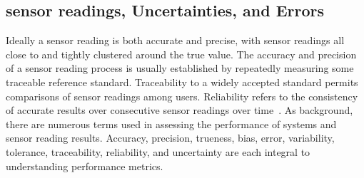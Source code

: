 \subsection{sensor readings, Uncertainties, and Errors}
Ideally a sensor reading is both accurate and precise, with sensor readings all close to and tightly clustered around the true value. The accuracy and precision of a sensor reading process is usually established by repeatedly measuring some traceable reference standard. Traceability to a widely accepted standard permits comparisons of sensor readings among users. Reliability refers to the consistency of accurate results over consecutive sensor readings over time~\cite{typereliability}.
As background, there are numerous terms used in assessing the performance of systems and sensor reading results. Accuracy, precision, trueness, bias, error, variability, tolerance, traceability, reliability, and uncertainty are each integral to understanding performance metrics.

